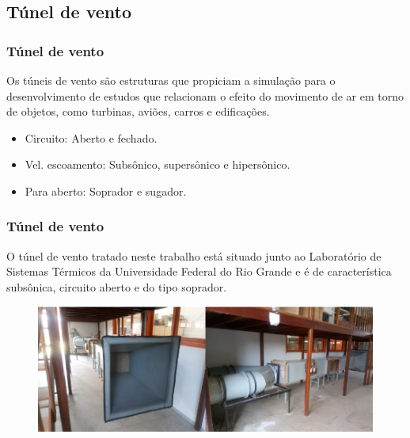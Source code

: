 \subsection{Túnel de vento}

\begin{frame}
\frametitle{Túnel de vento}

Os túneis de vento são estruturas que propiciam a simulação para o desenvolvimento de estudos que relacionam o efeito do movimento de ar em torno de objetos, como turbinas, aviões, carros e edificações. 

\begin{itemize}
    \item Circuito: Aberto e fechado.
    \item Vel. escoamento: Subsônico, supersônico e hipersônico.
    \item Para aberto: Soprador e sugador.
\end{itemize}

\end{frame}

\begin{frame}
\frametitle{Túnel de vento}

O túnel de vento tratado neste trabalho está situado junto ao Laboratório de Sistemas Térmicos da Universidade Federal do Rio Grande e é de característica subsônica, circuito aberto e do tipo soprador.

\begin{figure}
\centering
\includegraphics[scale = 0.4]{figs/tunelfran}
\end{figure}

\end{frame}
